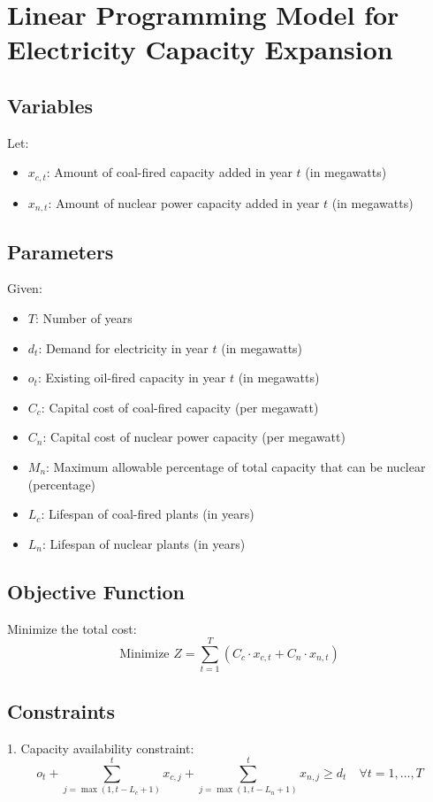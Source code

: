 \documentclass{article}
\begin{document}
\section*{Linear Programming Model for Electricity Capacity Expansion}

\subsection*{Variables}
Let:
\begin{itemize}
    \item \( x_{c,t} \): Amount of coal-fired capacity added in year \( t \) (in megawatts)
    \item \( x_{n,t} \): Amount of nuclear power capacity added in year \( t \) (in megawatts)
\end{itemize}

\subsection*{Parameters}
Given:
\begin{itemize}
    \item \( T \): Number of years
    \item \( d_t \): Demand for electricity in year \( t \) (in megawatts)
    \item \( o_t \): Existing oil-fired capacity in year \( t \) (in megawatts)
    \item \( C_c \): Capital cost of coal-fired capacity (per megawatt)
    \item \( C_n \): Capital cost of nuclear power capacity (per megawatt)
    \item \( M_n \): Maximum allowable percentage of total capacity that can be nuclear (percentage)
    \item \( L_c \): Lifespan of coal-fired plants (in years)
    \item \( L_n \): Lifespan of nuclear plants (in years)
\end{itemize}

\subsection*{Objective Function}
Minimize the total cost:
\[
\text{Minimize } Z = \sum_{t=1}^{T} \left( C_c \cdot x_{c,t} + C_n \cdot x_{n,t} \right)
\]

\subsection*{Constraints}
1. Capacity availability constraint:
\[
o_t + \sum_{j=\max(1, t-L_c+1)}^{t} x_{c,j} + \sum_{j=\max(1, t-L_n+1)}^{t} x_{n,j} \geq d_t \quad \forall t = 1, \ldots, T
\]
\end{document}
